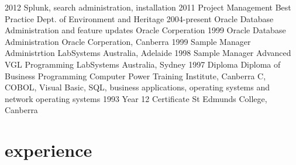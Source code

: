 \documentclass[]{friggeri-cv} %
\begin{document}
\begin{entrylist}
\entry
{2012}
{Splunk, search administration, installation}
{ }
{ }
\entry
{2011}
{Project Management Best Practice}
{Dept. of Environment and Heritage}
{ }
\entry
{2004-present}
{Oracle {\normalfont Database Administration and feature updates}}
{Oracle Corperation}
{ }
\entry
{1999}
{Oracle {\normalfont Database Administration}}
{Oracle Corperation, Canberra}
{ }
\entry
{1999}
{Sample Manager {\normalfont Administrtion}}
{LabSystems Australia, Adelaide}
{ }
\entry
{1998}
{Sample Manager {\normalfont Advanced VGL Programming}}
{LabSystems Australia, Sydney}
{ }
\entry
{1997}
{Diploma {\normalfont Diploma of Business Programming}}
{Computer Power Training Institute, Canberra}
{C, COBOL, Visual Basic, SQL, business applications, operating systems and network operating systems}
\entry
{1993}
{Year 12 Certificate}
{St Edmunds College, Canberra}
{ }
\end{entrylist}



\section{experience}
\end{document}
